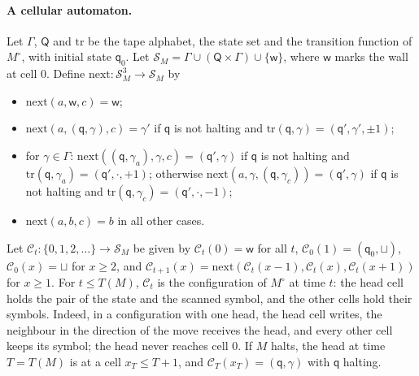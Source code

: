 \paragraph{A cellular automaton.} Let $\Gamma$, $\mathsf Q$ and $\mathrm{tr}$ be the tape alphabet, the state set and the transition function of $M^\circ$, with initial state $\mathsf q_0$. Let $\mathcal S_M=\Gamma\cup(\mathsf Q\times\Gamma)\cup\{\mathsf w\}$, where $\mathsf w$ marks the wall at cell $0$. Define $\mathrm{next}\colon\mathcal S_M^3\to\mathcal S_M$ by
\begin{itemize}
\item $\mathrm{next}(a,\mathsf w,c)=\mathsf w$;
\item $\mathrm{next}(a,(\mathsf q,\gamma),c)=\gamma'$ if $\mathsf q$ is not halting and $\mathrm{tr}(\mathsf q,\gamma)=(\mathsf q',\gamma',\pm1)$;
\item for $\gamma\in\Gamma$: $\mathrm{next}((\mathsf q,\gamma_a),\gamma,c)=(\mathsf q',\gamma)$ if $\mathsf q$ is not halting and $\mathrm{tr}(\mathsf q,\gamma_a)=(\mathsf q',\cdot,+1)$; otherwise $\mathrm{next}(a,\gamma,(\mathsf q,\gamma_c))=(\mathsf q',\gamma)$ if $\mathsf q$ is not halting and $\mathrm{tr}(\mathsf q,\gamma_c)=(\mathsf q',\cdot,-1)$;
\item $\mathrm{next}(a,b,c)=b$ in all other cases.
\end{itemize}
Let $\mathcal C_t\colon\{0,1,2,\dots\}\to\mathcal S_M$ be given by $\mathcal C_t(0)=\mathsf w$ for all $t$, $\mathcal C_0(1)=(\mathsf q_0,\sqcup)$, $\mathcal C_0(x)=\sqcup$ for $x\ge2$, and $\mathcal C_{t+1}(x)=\mathrm{next}(\mathcal C_t(x-1),\mathcal C_t(x),\mathcal C_t(x+1))$ for $x\ge1$. For $t\le T(M)$, $\mathcal C_t$ is the configuration of $M^\circ$ at time $t$: the head cell holds the pair of the state and the scanned symbol, and the other cells hold their symbols. Indeed, in a configuration with one head, the head cell writes, the neighbour in the direction of the move receives the head, and every other cell keeps its symbol; the head never reaches cell $0$. If $M$ halts, the head at time $T=T(M)$ is at a cell $x_T\le T+1$, and $\mathcal C_T(x_T)=(\mathsf q,\gamma)$ with $\mathsf q$ halting.

